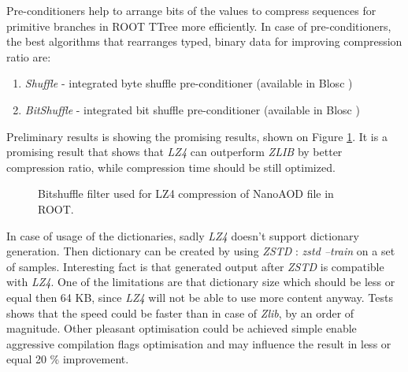 \documentclass[12pt]{iopart}
\begin{document}
Pre-conditioners help to arrange bits of the values to compress sequences for primitive branches in ROOT TTree more efficiently. In case of pre-conditioners, the best algorithms that rearranges typed, binary data for improving compression ratio are:
\begin{enumerate}
    \item \textit{Shuffle} - integrated byte shuffle pre-conditioner (available in Blosc \cite{blosc})
    \item \textit{BitShuffle} - integrated bit shuffle pre-conditioner (available in Blosc \cite{blosc})
\end{enumerate}

Preliminary results is showing the promising results, shown on Figure \ref{fig:bitshuffle}. It is a promising result that shows that \textit{LZ4} can outperform \textit{ZLIB} by better compression ratio, while compression time should be still optimized.
\begin{figure}
\centering
{}
\caption{Bitshuffle filter used for LZ4 compression of NanoAOD file in ROOT.} \label{fig:bitshuffle}
\end{figure}

In case of usage of the dictionaries, sadly \textit{LZ4} doesn't support dictionary generation. Then dictionary can be created by using \textit{ZSTD} \cite{zstd}: \textit{zstd --train} on a set of samples. Interesting fact is that generated output after \textit{ZSTD} is compatible with \textit{LZ4}. One of the limitations are that dictionary size which should be less or equal then 64 KB, since \textit{LZ4} will not be able to use more content anyway. Tests shows that the speed could be faster than in case of \textit{Zlib}, by an order of magnitude. Other pleasant optimisation could be achieved simple enable aggressive compilation flags optimisation and may influence the result in less or equal 20 \% improvement.
\end{document}
